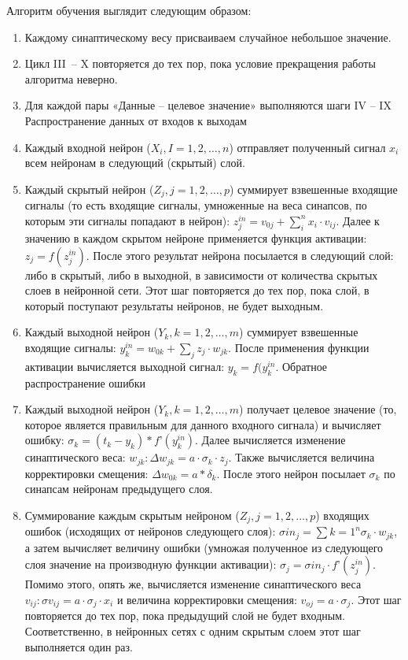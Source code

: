 \documentclass[12pt, a4paper]{article}
\begin{document}
Алгоритм обучения выглядит следующим образом:
\renewcommand{\labelenumi}{\Roman{enumi})}
\begin{enumerate}
		\item	Каждому синаптическому весу присваиваем случайное небольшое значение.
		\item	Цикл III~-- X повторяется до тех пор, пока условие прекращения работы алгоритма неверно.
		\item	Для каждой пары «Данные – целевое значение» выполняются шаги IV – IX
		Распространение данных от входов к выходам
		\item	Каждый входной нейрон ($X_i, I = 1,  2, …, n$) отправляет полученный сигнал $x_i$ всем нейронам в следующий (скрытый) слой.
		\item	Каждый скрытый нейрон ($Z_j, j = 1, 2, …, p$) суммирует взвешенные входящие сигналы (то есть входящие сигналы, умноженные на веса синапсов, по которым эти сигналы попадают в нейрон): $z_j^{in} = v_{0j} + \sum_i^n x_i \cdot v_{ij}$. Далее к значению в каждом скрытом нейроне применяется функция активации: $z_j = f(z_j^{in})$. После этого результат нейрона посылается в следующий слой: либо в скрытый, либо в выходной, в зависимости от количества скрытых слоев в нейронной сети. Этот шаг повторяется до тех пор, пока слой, в который поступают результаты нейронов, не будет выходным.
		\item	 Каждый выходной нейрон ($Y_k, k = 1, 2, …, m$) суммирует взвешенные входящие сигналы: $y_k^{in} = w_{0k} + \sum_j z_j \cdot w_{jk}$. После применения функции активации вычисляется выходной сигнал: $y_k = f(y_k^{in}$.
		Обратное распространение ошибки
		\item	Каждый выходной нейрон ($Y_k, k = 1, 2, …, m$) получает целевое значение (то, которое является правильным для данного входного сигнала) и вычисляет ошибку: $\sigma_k = (t_k - y_k) * f’(y_k^{in})$. Далее вычисляется изменение синаптического веса: $w_{jk}: \Delta w_{jk} = a \cdot \sigma_k \cdot z_j$. Также вычисляется величина корректировки смещения: $\Delta w_{0k} = a * \delta_k$. После этого нейрон посылает $\sigma_k$ по синапсам нейронам предыдущего слоя.
		\item	Суммирование каждым скрытым нейроном ($Z_j, j = 1, 2, …, p$) входящих ошибок (исходящих от нейронов следующего слоя): $\sigma in_j = \sum{k=1}^n \sigma_k \cdot w_{jk}$, а затем вычисляет величину ошибки (умножая полученное из следующего слоя значение на производную функции активации): $\sigma_j = \sigma in_j \cdot f’(z_j^{in})$. Помимо этого, опять же, вычисляется изменение синаптического веса$v_{ij} : \sigma v_{ij} = a  \cdot \sigma_j \cdot x_i$ и величина корректировки смещения: $v_{oj} = a \cdot \sigma_j$. Этот шаг повторяется до тех пор, пока предыдущий слой не будет входным. Соответственно, в нейронных сетях с одним скрытым слоем этот шаг выполняется один раз.

\end{enumerate}
\end{document}
